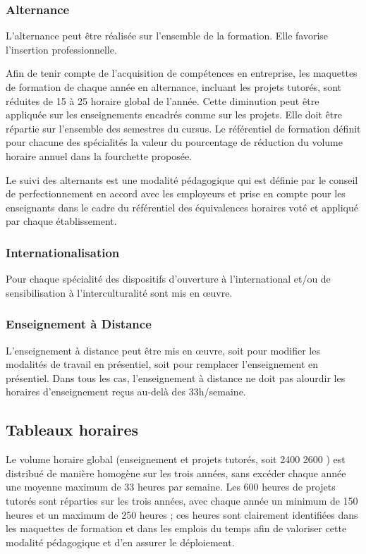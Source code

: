 \documentclass[10pt]{article}
\begin{document}
\subsubsection{Alternance}
L’alternance peut être réalisée sur l’ensemble de la formation. Elle
favorise l’insertion professionnelle.

Afin de tenir compte de l’acquisition de compétences en entreprise, les
maquettes de formation de chaque année en alternance, incluant les
projets tutorés, sont réduites de 15 à 25%
horaire global de l’année. Cette diminution peut être appliquée sur les
enseignements encadrés comme sur les projets. Elle doit être répartie
sur l’ensemble des semestres du cursus.  Le référentiel de formation
définit pour chacune des spécialités la valeur du pourcentage de
réduction du volume horaire annuel dans la fourchette proposée.

Le suivi des alternants est une modalité pédagogique qui est définie par
le conseil de perfectionnement en accord avec les employeurs et prise en
compte pour les enseignants dans le cadre du référentiel des
équivalences horaires voté et appliqué par chaque établissement.
\subsubsection{Internationalisation}

Pour chaque spécialité des dispositifs d’ouverture à l’international
et/ou de sensibilisation à l’interculturalité sont mis en œuvre.

\subsubsection{Enseignement à Distance}
L’enseignement à distance peut être mis en œuvre, soit pour modifier les
modalités de travail en présentiel, soit pour remplacer l’enseignement
en présentiel. Dans tous les cas, l’enseignement à distance ne doit pas
alourdir les horaires d’enseignement reçus au-delà des 33h/semaine.

\subsection{Tableaux horaires}
\selectallparcours
Le volume horaire global (enseignement et projets tutorés, soit
2400
2600
\unskip) est distribué de manière homogène sur
les trois années, sans excéder chaque année une moyenne maximum de 33 heures par semaine.
Les 600 heures de projets tutorés sont réparties sur les trois années, avec chaque année un
minimum de 150 heures et un maximum de 250 heures ; ces heures sont clairement identifiées
dans les maquettes de formation et dans les emplois du temps afin de valoriser cette modalité
pédagogique et d’en assurer le déploiement.
\end{document}

